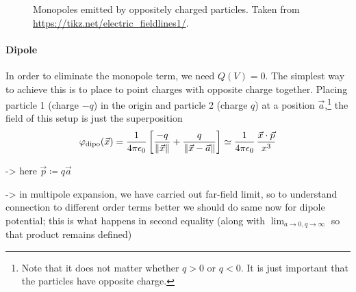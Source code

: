 \documentclass[../class_mech_main.tex]{subfiles}
\DeclareMathOperator{\fpeps}{\frac{1}{4 \pi \epsilon_0}}
\begin{document}
\begin{figure}
    \centering

    \hspace*{0.1\textwidth}%

    \caption{Monopoles emitted by oppositely charged particles. Taken from \url{https://tikz.net/electric_fieldlines1/}.}
    \label{fig:monopoles}
\end{figure}



            \paragraph{Dipole}
In order to eliminate the monopole term, we need $Q(V) = 0$. The simplest way to achieve this is to place to point charges with opposite charge together. Placing particle 1 (charge $-q$) in the origin and particle 2 (charge $q$) at a position $\vec{a}$,\footnote{Note that it does not matter whether $q > 0$ or $q < 0$. It is just important that the particles have opposite charge.} the field of this setup is just the superposition
\begin{equation}
    \varphi_\mathrm{dipo}(\vec{x})
    = \fpeps \qty[\frac{-q}{\norm{\vec{x}}} + \frac{q}{\norm{\vec{x} - \vec{a}}}]
    \simeq \fpeps \frac{\vec{x} \cdot \vec{p}}{x^3}
\end{equation}

-> here $\vec{p} \coloneqq q \vec{a}$


-> in multipole expansion, we have carried out far-field limit, so to understand connection to different order terms better we should do same now for dipole potential; this is what happens in second equality (along with $\lim_{a \rightarrow 0, q \rightarrow \infty}$ so that product remains defined)
\end{document}
